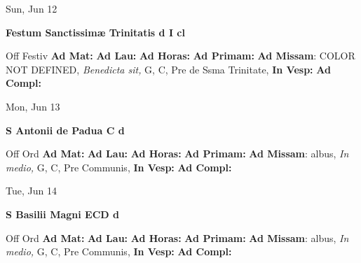 \documentclass[10pt]{memoir}
\begin{document}
\begin{center}
\begin{minipage}{3.5in}
\vspace{2em}
\begin{center}Sun, Jun 12
\end{center}
\textbf{ \large Festum Sanctissimæ Trinitatis
\textnormal{\normalsize d I cl}}

\begin{justify}Off Festiv
\textbf{Ad Mat: }
\textbf{Ad Lau: }
\textbf{Ad Horas: }
\textbf{Ad Primam: }\textbf{Ad Missam}: COLOR NOT DEFINED, \textit{Benedicta sit,} G, C, Pre de Ssma Trinitate, 
\textbf{In Vesp: }
\textbf{Ad Compl: }
\end{justify}
\end{minipage}
\end{center}

\begin{center}
\begin{minipage}{3.5in}
\vspace{2em}
\begin{center}Mon, Jun 13
\end{center}
\textbf{ \large S Antonii de Padua C
\textnormal{\normalsize d}}

\begin{justify}Off Ord
\textbf{Ad Mat: }
\textbf{Ad Lau: }
\textbf{Ad Horas: }
\textbf{Ad Primam: }\textbf{Ad Missam}: albus, \textit{In medio,} G, C, Pre Communis, 
\textbf{In Vesp: }
\textbf{Ad Compl: }
\end{justify}
\end{minipage}
\end{center}

\begin{center}
\begin{minipage}{3.5in}
\vspace{2em}
\begin{center}Tue, Jun 14
\end{center}
\textbf{ \large S Basilii Magni ECD
\textnormal{\normalsize d}}

\begin{justify}Off Ord
\textbf{Ad Mat: }
\textbf{Ad Lau: }
\textbf{Ad Horas: }
\textbf{Ad Primam: }\textbf{Ad Missam}: albus, \textit{In medio,} G, C, Pre Communis, 
\textbf{In Vesp: }
\textbf{Ad Compl: }
\end{justify}
\end{minipage}
\end{center}
\end{document}
